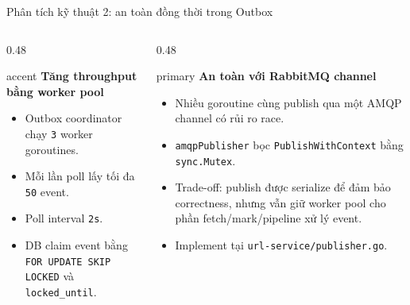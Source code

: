 \documentclass[aspectratio=169]{beamer}
\begin{document}
\begin{frame}{Phân tích kỹ thuật 2: an toàn đồng thời trong Outbox}
    \begin{columns}[T,onlytextwidth]
        \begin{column}{0.48\textwidth}
            \begin{claimbox}{accent}
                \textbf{Tăng throughput bằng worker pool}
                \begin{itemize}\small
                    \item Outbox coordinator chạy \texttt{3} worker goroutines.
                    \item Mỗi lần poll lấy tối đa \texttt{50} event.
                    \item Poll interval \texttt{2s}.
                    \item DB claim event bằng \texttt{FOR UPDATE SKIP LOCKED} và \texttt{locked\_until}.
                \end{itemize}
            \end{claimbox}
        \end{column}
        \begin{column}{0.48\textwidth}
            \begin{claimbox}{primary}
                \textbf{An toàn với RabbitMQ channel}
                \begin{itemize}\small
                    \item Nhiều goroutine cùng publish qua một AMQP channel có rủi ro race.
                    \item \texttt{amqpPublisher} bọc \texttt{PublishWithContext} bằng \texttt{sync.Mutex}.
                    \item Trade-off: publish được serialize để đảm bảo correctness, nhưng vẫn giữ worker pool cho phần fetch/mark/pipeline xử lý event.
                    \item Implement tại \texttt{url-service/publisher.go}.
                \end{itemize}
            \end{claimbox}
        \end{column}
    \end{columns}
\end{frame}
\end{document}
